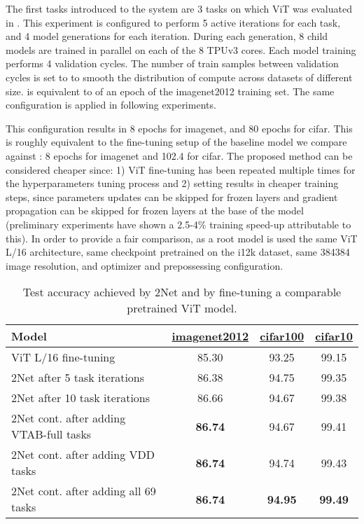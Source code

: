 \documentclass{article} \usepackage{iclr2023_conference,times}
\newcommand{\muNet}{2Net\xspace}
\begin{document}
The first tasks introduced to the system are 3 tasks on which ViT was evaluated in \citet{Dosovitskiy2021AnII}.
This experiment is configured to perform 5 active iterations for each task,
and 4 model generations for each iteration.
During each generation, 8 child models are trained in parallel on each of the 8 TPUv3 cores.
Each model training performs 4 validation cycles.
The number of train samples between validation cycles is set to  to smooth the distribution of compute across datasets of different size.
 is equivalent to 
of an epoch of the imagenet2012 training set.
The same configuration is applied in following experiments.


This configuration results in 8 epochs for imagenet, and 80 epochs for cifar. This is roughly equivalent to the fine-tuning setup of the baseline model we compare against
\citep{Dosovitskiy2021AnII}: 8 epochs for imagenet and 102.4 for cifar.
The proposed method can be considered cheaper since: 1) ViT fine-tuning has been repeated multiple times for the hyperparameters tuning process and
2) setting  results in
cheaper training steps, since parameters updates can be skipped for frozen layers and gradient propagation can be skipped for frozen layers at the base of the model (preliminary experiments have shown a 2.5-4\% training speed-up attributable to this).
In order to provide a fair comparison, as a root model is used the same ViT L/16 architecture, same checkpoint pretrained on the i12k dataset, same 384384 image resolution, 
and optimizer and prepossessing configuration.

\begin{table}[b]
\vspace{-10pt}
  \caption{
Test accuracy achieved by \muNet and by fine-tuning a comparable pretrained ViT model.
  }
\vspace{-6pt}
  \label{table:vit-bench}
  \small
  \centering
  \begin{tabular}{lccc}
    \toprule
Model
& \href{https://www.tensorflow.org/datasets/catalog/imagenet2012}{imagenet2012}
    & \href{https://www.tensorflow.org/datasets/catalog/cifar100}{cifar100}
    & \href{https://www.tensorflow.org/datasets/catalog/cifar10}{cifar10}

\\
    \midrule
    ViT L/16 fine-tuning \citep{Dosovitskiy2021AnII} & 85.30  & 93.25 & 99.15  \\
    \muNet after 5 task iterations & 86.38  & 94.75 & 99.35  \\
    \muNet after 10 task iterations & 86.66  & 94.67 & 99.38  \\
    \muNet cont. after adding VTAB-full tasks  & \textbf{86.74} & 94.67 & 99.41  \\
    \muNet cont. after adding VDD tasks  & \textbf{86.74}  & 94.74 & 99.43  \\
    \muNet cont. after adding all 69 tasks & \textbf{86.74}  & \textbf{94.95} & \textbf{99.49}  \\
    \bottomrule
  \end{tabular}
  \vspace{-10pt}
\end{table}
\end{document}
